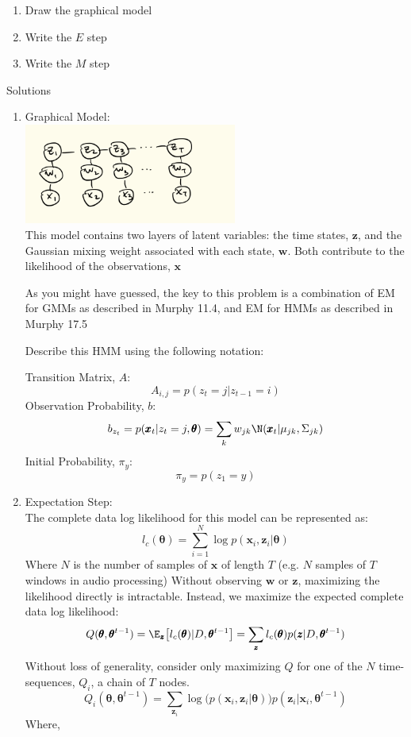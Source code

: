 \documentclass{article}
\begin{document}
\begin{enumerate}
\item Draw the graphical model
\item Write the $E$ step 
\item Write the $M$ step	
\end{enumerate}

{\Large Solutions}

\begin{enumerate}
	\item Graphical Model: \\
	\includegraphics[width=7cm]{hand_GMM_HMM} \\
	This model contains two layers of latent variables: the time states, $\pmb{z}$, and the Gaussian mixing weight associated with each state, $\pmb{w}$. Both contribute to the likelihood of the observations, $\pmb{x}$
	
	As you might have guessed, the key to this problem is a combination of EM for GMMs as described in Murphy 11.4, and EM for HMMs as described in Murphy 17.5
	
	Describe this HMM using the following notation:  
	
	Transition Matrix, $A$: 
	$$
	A_{i,j} = p(z_t = j | z_{t-1} = i) 
	$$
	Observation Probability, $b$: 
	$$
	b_{z_t} = p(\pmb{x}_t| z_t = j, \pmb{\theta}) = \sum_k w_{jk} \N (\pmb{x}_t | \mu_{jk}, \Sigma_{jk}) 
	$$
	Initial Probability, $\pi_y$:
	$$
	\pi_y = p(z_1 = y)
	$$ 
	
	
	\item Expectation Step: \\
	The complete data log likelihood for this model can be represented as: 
	$$
	l_c(\pmb{\theta}) = \sum_{i=1}^{N} \log p(\pmb{x}_i, \pmb{z}_i | \pmb{\theta})
	$$
	Where $N$ is the number of samples of $\pmb{x}$ of length $T$ (e.g. $N$ samples of $T$ windows in audio processing) 
	Without observing $\pmb{w}$ or $\pmb{z}$, maximizing the likelihood directly is intractable. Instead, we maximize the expected complete data log likelihood:
	$$
	Q(\pmb{\theta}, \pmb{\theta}^{t-1}) = \E_{\pmb{z}} \big[ l_c(\pmb{\theta}) | D, \pmb{\theta}^{t-1} \big] =\sum_{\pmb{z}} l_c(\pmb{\theta}) p(\pmb{z} | D,\pmb{\theta}^{t-1}) 
	$$ 
	Without loss of generality, consider only maximizing $Q$ for one of the $N$ time-sequences, $Q_i$, a chain of $T$ nodes. 
	$$
	Q_i(\pmb{\theta}, \pmb{\theta}^{t-1}) = \sum_{\pmb{z}_i} \log \Big( p(\pmb{x}_i, \pmb{z}_i | \pmb{\theta}) \Big) p(\pmb{z}_i |\pmb{x}_i,  \pmb{\theta}^{t-1})
	$$
	Where, 
	

\end{enumerate}
\end{document}
